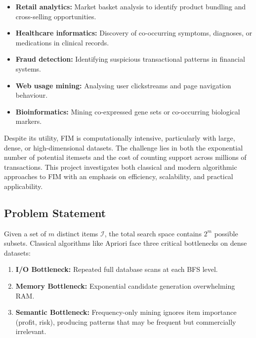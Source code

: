 \documentclass[conference]{IEEEtran}
\begin{document}
\begin{itemize}
    \item \textbf{Retail analytics:} Market basket analysis to identify product bundling and cross-selling opportunities.
    \item \textbf{Healthcare informatics:} Discovery of co-occurring symptoms, diagnoses, or medications in clinical records.
    \item \textbf{Fraud detection:} Identifying suspicious transactional patterns in financial systems.
    \item \textbf{Web usage mining:} Analysing user clickstreams and page navigation behaviour.
    \item \textbf{Bioinformatics:} Mining co-expressed gene sets or co-occurring biological markers.
\end{itemize}

Despite its utility, FIM is computationally intensive, particularly with large, dense, or high-dimensional datasets. The challenge lies in both the exponential number of potential itemsets and the cost of counting support across millions of transactions. This project investigates both classical and modern algorithmic approaches to FIM with an emphasis on efficiency, scalability, and practical applicability.

\subsection{Problem Statement}
Given a set of $m$ distinct items $\mathcal{I}$, the total search space contains $2^m$ possible subsets. Classical algorithms like Apriori face three critical bottlenecks on dense datasets:
\begin{enumerate}
    \item \textbf{I/O Bottleneck:} Repeated full database scans at each BFS level.
    \item \textbf{Memory Bottleneck:} Exponential candidate generation overwhelming RAM.
    \item \textbf{Semantic Bottleneck:} Frequency-only mining ignores item importance (profit, risk), producing patterns that may be frequent but commercially irrelevant.
\end{enumerate}
\end{document}
